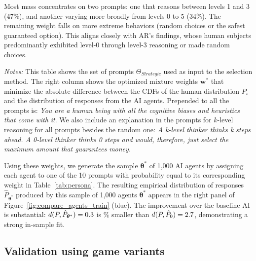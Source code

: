 \documentclass[11pt]{article}
\theoremstyle{definition}
\newcommand{\aisub}{AI agent}
\newcommand{\persona}{prompt}
\begin{document}
Most mass concentrates on two \persona{s}: one that reasons between levels 1 and 3 (47\%), and another varying more broadly from levels 0 to 5 (34\%). 
The remaining weight falls on more extreme behaviors (random choices or the safest guaranteed option). 
This aligns closely with AR's findings, whose human subjects predominantly exhibited level-0 through level-3 reasoning or made random choices.

\begin{table}[h!]
\begin{center}
\caption{Proposed \aisub{} \persona{s} and resulting mixture weights from the selection method} 
\label{tab:persona}
\footnotesize
\setlength{\tabcolsep}{7pt}

\end{center}
\begin{footnotesize}
\begin{singlespace}
\vspace*{-0.05in}
\emph{Notes:}
This table shows the set of \persona{s} $\Theta_{Strategic}$ used as input to the selection method.
The right column shows the optimized mixture weights $\mathbf{w}^*$ that minimize the absolute difference between the CDFs of the human distribution $P_s$ and the distribution of responses from the \aisub{s}.
Prepended to all the \persona{s} is: \emph{You are a human being with all the cognitive biases and heuristics that come with it}. 
We also include an explanation in the prompts for $k$-level reasoning for all \persona{s} besides the random one: \emph{A k-level thinker thinks k steps ahead. A 0-level thinker thinks 0 steps and would, therefore, just select the maximum amount that guarantees money.}
\end{singlespace}
\end{footnotesize}
\end{table}
  
Using these weights, we generate the sample $\bm{\theta}^*$ of 1,000 \aisub{s} by assigning each agent to one of the 10 \persona{s} with probability equal to its corresponding weight in Table~\ref{tab:persona}. 
The resulting empirical distribution of responses $\hat P_{\bm\theta^*}$ produced by this sample of 1,000 agents $\bm{\theta}^*$ appears in the right panel of Figure~\ref{fig:compare_agents_train} (blue).
The improvement over the baseline AI is substantial: $d(P, \hat P_{\bm\theta^*}) = 0.3$ is \KlPercDiffBasic\% smaller than $d(P, \hat P_0) = 2.7$, demonstrating a strong in-sample fit.
  
\subsection{Validation using game variants}
\end{document}
